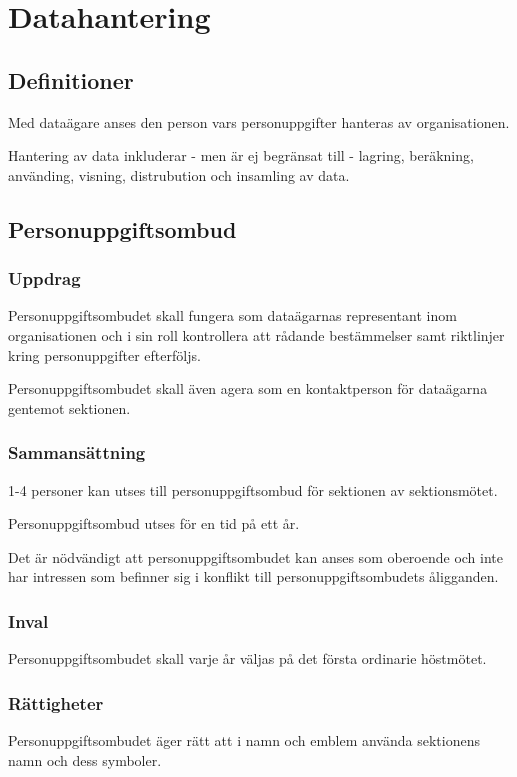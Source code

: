 \section{Datahantering}

\subsection{Definitioner}
	    
	    Med dataägare anses den person vars personuppgifter hanteras av organisationen.
	    
	    Hantering av data inkluderar - men är ej begränsat till - lagring, beräkning, använding, visning, distrubution och insamling av data.

\subsection{Personuppgiftsombud}

\subsubsection{Uppdrag}
 Personuppgiftsombudet skall fungera som dataägarnas representant inom organisationen och i sin roll kontrollera att rådande bestämmelser samt riktlinjer kring personuppgifter efterföljs.
 
 Personuppgiftsombudet skall även agera som en kontaktperson för dataägarna gentemot sektionen.

\subsubsection{Sammansättning}
1-4 personer kan utses till personuppgiftsombud för sektionen av sektionsmötet.

Personuppgiftsombud utses för en tid på ett år.

Det är nödvändigt att personuppgiftsombudet kan anses som oberoende och inte har intressen som befinner sig i konflikt till personuppgiftsombudets åligganden.

\subsubsection{Inval}
Personuppgiftsombudet skall varje år väljas på det första ordinarie höstmötet.

\subsubsection{Rättigheter}
Personuppgiftsombudet äger rätt att i namn och emblem använda sektionens namn
och dess symboler.

